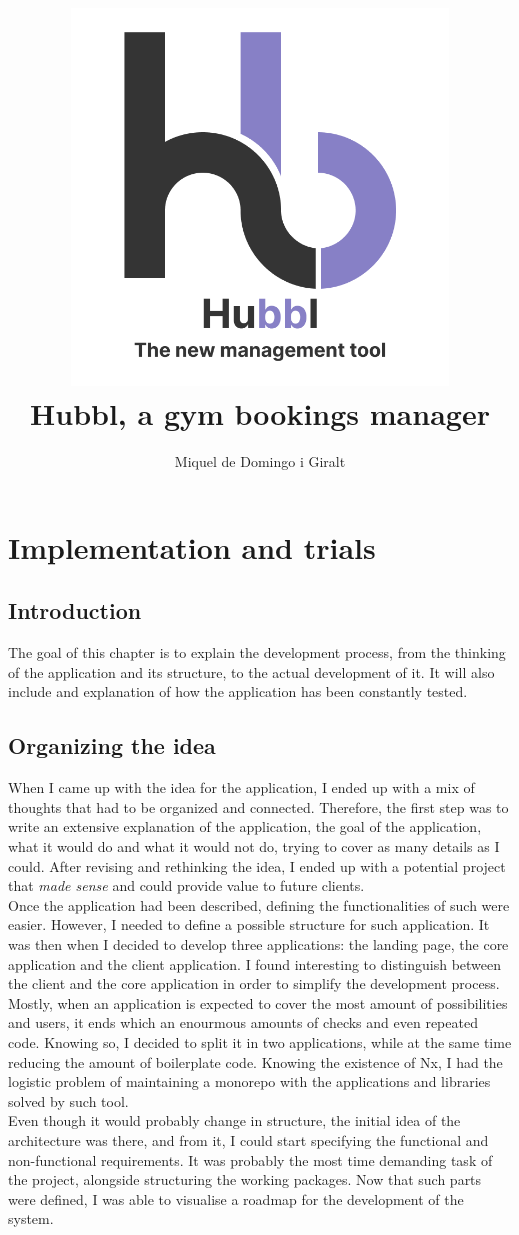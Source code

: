 \documentclass[a4paper, 12pt, oneside]{book}
\title{
	\includegraphics[width=0.75\textwidth]{assets/logo.png}
	\\
	{\huge Hubbl, a gym bookings manager}
}
\author{Miquel de Domingo i Giralt}
\begin{document}
\frontmatter
\maketitle
\mainmatter
\chapter{Implementation and trials}
\section{Introduction}
The goal of this chapter is to explain the development process, from the thinking of the application and its structure, to the actual development of it. It will also include and explanation of how the application has been constantly tested.
\section{Organizing the idea}
When I came up with the idea for the application, I ended up with a mix of thoughts that had to be organized and connected. Therefore, the first step was to write an extensive explanation of the application, the goal of the application, what it would do and what it would not do, trying to cover as many details as I could. After revising and rethinking the idea, I ended up with a potential project that \emph{made sense} and could provide value to future clients.
\\[8pt]
Once the application had been described, defining the functionalities of such were easier. However, I needed to define a possible structure for such application. It was then when I decided to develop three applications: the landing page, the core application and the client application. I found interesting to distinguish between the client and the core application in order to simplify the development process. Mostly, when an application is expected to cover the most amount of possibilities and users, it ends which an enourmous amounts of checks and even repeated code. Knowing so, I decided to split it in two applications, while at the same time reducing the amount of boilerplate code. Knowing the existence of Nx, I had the logistic problem of maintaining a monorepo with the applications and libraries solved by such tool.
\\[8pt]
Even though it would probably change in structure, the initial idea of the architecture was there, and from it, I could start specifying the functional and non-functional requirements. It was probably the most time demanding task of the project, alongside structuring the working packages. Now that such parts were defined, I was able to visualise a roadmap for the development of the system.
\end{document}
